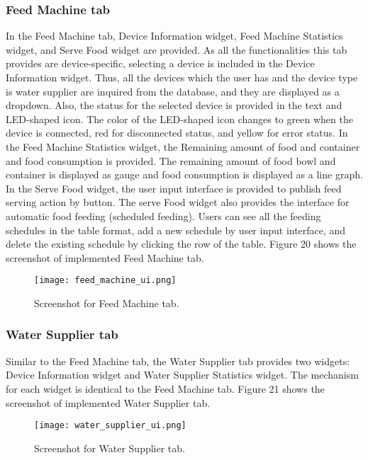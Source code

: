 \documentclass[conference]{IEEEtran}
\begin{document}
\subsubsection{Feed Machine tab}
In the Feed Machine tab, Device Information widget, Feed Machine Statistics widget, and Serve Food widget are provided. As all the functionalities this tab provides are device-specific, selecting a device is included in the Device Information widget. Thus, all the devices which the user has and the device type is water supplier are inquired from the database, and they are displayed as a dropdown. Also, the status for the selected device is provided in the text and LED-shaped icon. The color of the LED-shaped icon changes to green when the device is connected, red for disconnected status, and yellow for error status. In the Feed Machine Statistics widget, the Remaining amount of food and container and food consumption is provided. The remaining amount of food bowl and container is displayed as gauge and food consumption is displayed as a line graph. In the Serve Food widget, the user input interface is provided to publish feed serving action by button. The serve Food widget also provides the interface for automatic food feeding (scheduled feeding). Users can see all the feeding schedules in the table format, add a new schedule by user input interface, and delete the existing schedule by clicking the row of the table. Figure 20
shows the screenshot of implemented Feed Machine tab.

\begin{figure}[htbp]
\centerline{\texttt{[image: feed\_machine\_ui.png]}}
\caption{Screenshot for Feed Machine tab.}
\label{fig}
\end{figure}

\subsubsection{Water Supplier tab}
Similar to the Feed Machine tab, the Water Supplier tab provides two widgets: Device Information widget and Water Supplier Statistics widget. The mechanism for each widget is identical to the Feed Machine tab. Figure 21
shows the screenshot of implemented Water Supplier tab.

\begin{figure}[htbp]
\centerline{\texttt{[image: water\_supplier\_ui.png]}}
\caption{Screenshot for Water Supplier tab.}
\label{fig}
\end{figure}
\end{document}
